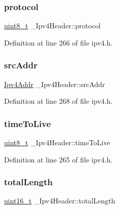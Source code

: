 \subsubsection{\texorpdfstring{protocol}{protocol}}
{\footnotesize\ttfamily \hyperlink{stdint_8h_aba7bc1797add20fe3efdf37ced1182c5}{uint8\+\_\+t} \+\_\+\+Ipv4\+Header\+::protocol}



Definition at line 266 of file ipv4.\+h.

\mbox{\label{struct__Ipv4Header_a5016c85d79e8e81afd5f943a2f84ba17}} 
\subsubsection{\texorpdfstring{src\+Addr}{srcAddr}}
{\footnotesize\ttfamily \hyperlink{ipv4_8h_a411debb3d770caa0c06d3f73367da37f}{Ipv4\+Addr} \+\_\+\+Ipv4\+Header\+::src\+Addr}



Definition at line 268 of file ipv4.\+h.

\mbox{\label{struct__Ipv4Header_a3cf70b8027490b5b6f90c225d7bd2946}} 
\subsubsection{\texorpdfstring{time\+To\+Live}{timeToLive}}
{\footnotesize\ttfamily \hyperlink{stdint_8h_aba7bc1797add20fe3efdf37ced1182c5}{uint8\+\_\+t} \+\_\+\+Ipv4\+Header\+::time\+To\+Live}



Definition at line 265 of file ipv4.\+h.

\mbox{\label{struct__Ipv4Header_ac7b0c8cf9e952b36e2ead5389f260f9f}} 
\subsubsection{\texorpdfstring{total\+Length}{totalLength}}
{\footnotesize\ttfamily \hyperlink{stdint_8h_a273cf69d639a59973b6019625df33e30}{uint16\+\_\+t} \+\_\+\+Ipv4\+Header\+::total\+Length}



